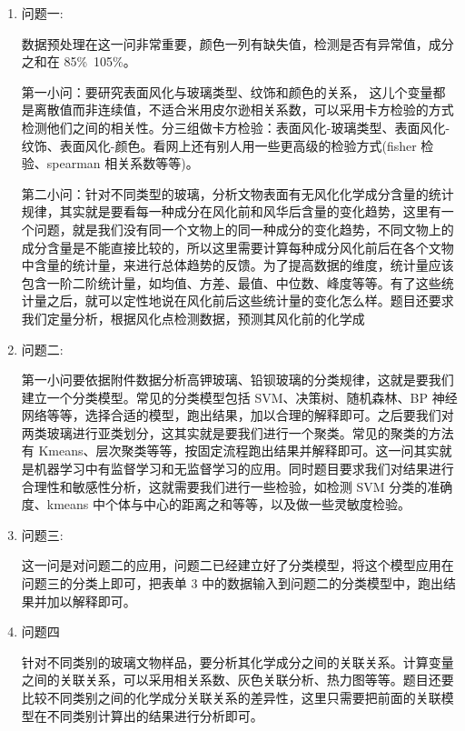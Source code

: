 \documentclass[12pt]{ctexart}
\numberwithin{equation}{section} %
\begin{document}
\begin{enumerate}

  \item 问题一:

数据预处理在这一问非常重要，颜色一列有缺失值，检测是否有异常值，成分之和在 85\%~105\%。

第一小问：要研究表面风化与玻璃类型、纹饰和颜色的关系， 这儿个变量都是离散值而非连续值，不适合米用皮尔逊相关系数，可以采用卡方检验的方式检测他们之间的相关性。分三组做卡方检验：表面风化-玻璃类型、表面风化-纹饰、表面风化-颜色。看网上还有别人用一些更高级的检验方式(fisher 检验、spearman 相关系数等等)。

第二小问：针对不同类型的玻璃，分析文物表面有无风化化学成分含量的统计规律，其实就是要看每一种成分在风化前和风华后含量的变化趋势，这里有一个问题，就是我们没有同一个文物上的同一种成分的变化趋势，不同文物上的成分含量是不能直接比较的，所以这里需要计算每种成分风化前后在各个文物中含量的统计量，来进行总体趋势的反馈。为了提高数据的维度，统计量应该包含一阶二阶统计量，如均值、方差、最值、中位数、峰度等等。有了这些统计量之后，就可以定性地说在风化前后这些统计量的变化怎么样。题目还要求我们定量分析，根据风化点检测数据，预测其风化前的化学成
 \item 问题二:

 第一小问要依据附件数据分析高钾玻璃、铅钡玻璃的分类规律，这就是要我们建立一个分类模型。常见的分类模型包括 SVM、决策树、随机森林、BP 神经网络等等，选择合适的模型，跑出结果，加以合理的解释即可。之后要我们对两类玻璃进行亚类划分，这其实就是要我们进行一个聚类。常见的聚类的方法有 Kmeans、层次聚类等等，按固定流程跑出结果并解释即可。这一问其实就是机器学习中有监督学习和无监督学习的应用。同时题目要求我们对结果进行合理性和敏感性分析，这就需要我们进行一些检验，如检测 SVM 分类的准确度、kmeans 中个体与中心的距离之和等等，以及做一些灵敏度检验。
\item 问题三:

这一问是对问题二的应用，问题二已经建立好了分类模型，将这个模型应用在问题三的分类上即可，把表单 3 中的数据输入到问题二的分类模型中，跑出结果并加以解释即可。

\item 问题四

针对不同类别的玻璃文物样品，要分析其化学成分之间的关联关系。计算变量之间的关联关系，可以采用相关系数、灰色关联分析、热力图等等。题目还要比较不同类别之间的化学成分关联关系的差异性，这里只需要把前面的关联模型在不同类别计算出的结果进行分析即可。



\end{enumerate}



\newpage
\end{document}
